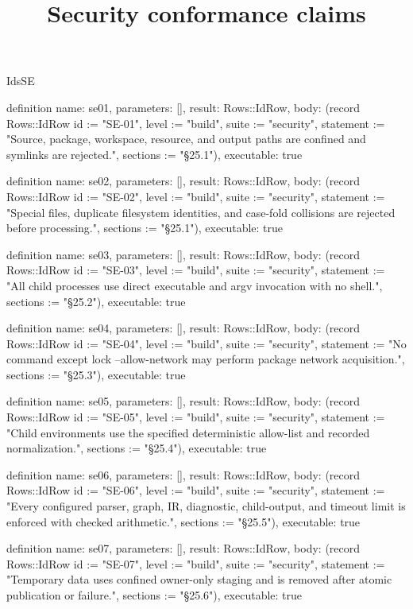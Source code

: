 \begin{lexlean}{IdsSE}
\title{Security conformance claims}
\begin{semanticmodule}
definition{
  name: se01,
  parameters: [],
  result: Rows::IdRow,
  body: (record Rows::IdRow {id := "SE-01", level := "build", suite := "security", statement := "Source, package, workspace, resource, and output paths are confined and symlinks are rejected.", sections := "§25.1"}),
  executable: true
}

definition{
  name: se02,
  parameters: [],
  result: Rows::IdRow,
  body: (record Rows::IdRow {id := "SE-02", level := "build", suite := "security", statement := "Special files, duplicate filesystem identities, and case-fold collisions are rejected before processing.", sections := "§25.1"}),
  executable: true
}

definition{
  name: se03,
  parameters: [],
  result: Rows::IdRow,
  body: (record Rows::IdRow {id := "SE-03", level := "build", suite := "security", statement := "All child processes use direct executable and argv invocation with no shell.", sections := "§25.2"}),
  executable: true
}

definition{
  name: se04,
  parameters: [],
  result: Rows::IdRow,
  body: (record Rows::IdRow {id := "SE-04", level := "build", suite := "security", statement := "No command except lock --allow-network may perform package network acquisition.", sections := "§25.3"}),
  executable: true
}

definition{
  name: se05,
  parameters: [],
  result: Rows::IdRow,
  body: (record Rows::IdRow {id := "SE-05", level := "build", suite := "security", statement := "Child environments use the specified deterministic allow-list and recorded normalization.", sections := "§25.4"}),
  executable: true
}

definition{
  name: se06,
  parameters: [],
  result: Rows::IdRow,
  body: (record Rows::IdRow {id := "SE-06", level := "build", suite := "security", statement := "Every configured parser, graph, IR, diagnostic, child-output, and timeout limit is enforced with checked arithmetic.", sections := "§25.5"}),
  executable: true
}

definition{
  name: se07,
  parameters: [],
  result: Rows::IdRow,
  body: (record Rows::IdRow {id := "SE-07", level := "build", suite := "security", statement := "Temporary data uses confined owner-only staging and is removed after atomic publication or failure.", sections := "§25.6"}),
  executable: true
}


\end{semanticmodule}
\end{lexlean}
